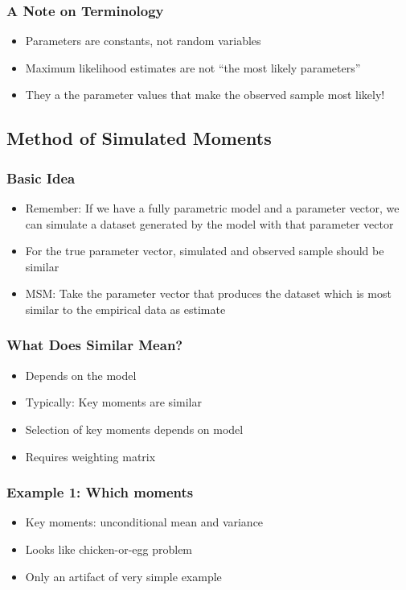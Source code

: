 \documentclass[11pt]{beamer}
\begin{document}
\begin{frame}[c]\frametitle{A Note on Terminology}
    \begin{itemize}
        \item Parameters are constants, not random variables
        \item Maximum likelihood estimates are not ``the most likely parameters''
        \item They a the parameter values that make the observed sample most likely!
    \end{itemize}
\end{frame}




\subsection{Method of Simulated Moments}


\begin{frame}[c]\frametitle{Basic Idea}
        \begin{itemize}
            \item Remember: If we have a fully parametric model and a parameter vector, we can simulate a dataset generated by the model with that parameter vector
            \item For the true parameter vector, simulated and observed sample should be similar
            \item MSM: Take the parameter vector that produces the dataset which is most similar to the empirical data as estimate
        \end{itemize}
\end{frame}


\begin{frame}[c]\frametitle{What Does Similar Mean?}
    \begin{itemize}
        \item Depends on the model
        \item Typically: Key moments are similar
        \item Selection of key moments depends on model
        \item Requires weighting matrix
    \end{itemize}
\end{frame}



\begin{frame}[c]\frametitle{Example 1: Which moments}
    \begin{itemize}
        \item Key moments: unconditional mean and variance
        \item Looks like chicken-or-egg problem
        \item Only an artifact of very simple example
    \end{itemize}
\end{frame}
\end{document}
